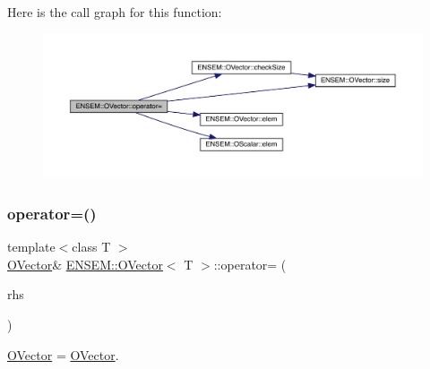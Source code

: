 Here is the call graph for this function\+:
\nopagebreak
\begin{figure}[H]
\begin{center}
\leavevmode
\includegraphics[width=350pt]{d0/d8d/classENSEM_1_1OVector_a31b08dda73879d2a39c4a0bec90bc401_cgraph}
\end{center}
\end{figure}
\mbox{\label{classENSEM_1_1OVector_af1d768a4392ac2caf7d93faef7b39ed2}} 
\subsubsection{\texorpdfstring{operator=()}{operator=()}\hspace{0.1cm}{\footnotesize\ttfamily [7/12]}}
{\footnotesize\ttfamily template$<$class T $>$ \\
\mbox{\hyperlink{classENSEM_1_1OVector}{O\+Vector}}\& \mbox{\hyperlink{classENSEM_1_1OVector}{E\+N\+S\+E\+M\+::\+O\+Vector}}$<$ T $>$\+::operator= (\begin{DoxyParamCaption}\item[{const \mbox{\hyperlink{classENSEM_1_1OVector}{O\+Vector}}$<$ T $>$ \&}]{rhs }\end{DoxyParamCaption})\hspace{0.3cm}{\ttfamily [inline]}}



\mbox{\hyperlink{classENSEM_1_1OVector}{O\+Vector}} = \mbox{\hyperlink{classENSEM_1_1OVector}{O\+Vector}}. 


